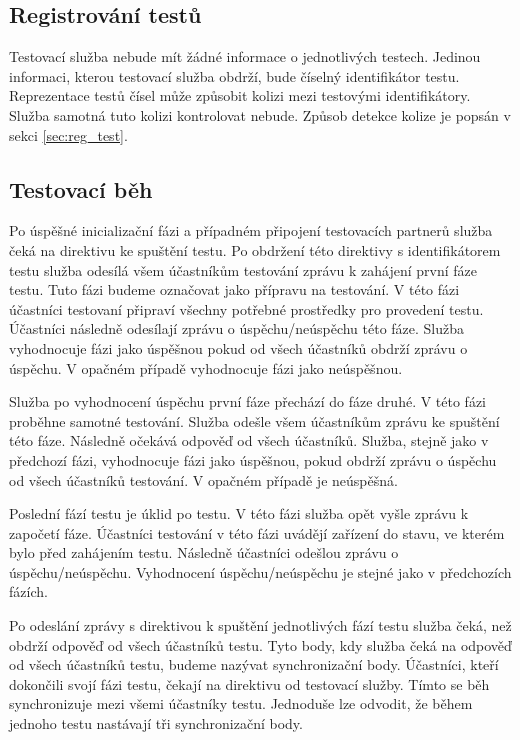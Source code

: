 \subsection{Registrování testů}
Testovací služba nebude mít žádné informace o jednotlivých testech. Jedinou informaci, kterou testovací služba obdrží, bude číselný identifikátor testu. Reprezentace testů čísel může způsobit kolizi mezi testovými identifikátory. Služba samotná tuto kolizi kontrolovat nebude. Způsob detekce kolize je popsán v sekci \ref{sec:reg_test}.

\subsection{Testovací běh}\label{sec:test_run}
Po úspěšné inicializační fázi a případném připojení testovacích partnerů služba čeká na direktivu ke spuštění testu. Po obdržení této direktivy s identifikátorem testu služba odesílá všem účastníkům testování zprávu k zahájení první fáze testu. Tuto fázi budeme označovat jako přípravu na testování. V této fázi účastníci testovaní připraví všechny potřebné prostředky pro provedení testu. Účastníci následně odesílají zprávu o úspěchu/neúspěchu této fáze. Služba vyhodnocuje fázi jako úspěšnou pokud od všech účastníků obdrží zprávu o úspěchu. V opačném případě vyhodnocuje fázi jako neúspěšnou.

Služba po vyhodnocení úspěchu první fáze přechází do fáze druhé. V této fázi proběhne samotné testování. Služba odešle všem účastníkům zprávu ke spuštění této fáze. Následně očekává odpověď od všech účastníků. Služba, stejně jako v předchozí fázi, vyhodnocuje fázi jako úspěšnou, pokud obdrží zprávu o úspěchu od všech účastníků testování. V opačném případě je neúspěšná.

Poslední fází testu je úklid po testu. V této fázi služba opět vyšle zprávu k započetí fáze. Účastníci testování v této fázi uvádějí zařízení do stavu, ve kterém bylo před zahájením testu. Následně účastníci odešlou zprávu o úspěchu/neúspěchu. Vyhodnocení úspěchu/neúspěchu je stejné jako v předchozích fázích.

Po odeslání zprávy s direktivou k spuštění jednotlivých fází testu služba čeká, než obdrží odpověď od všech účastníků testu. Tyto body, kdy služba čeká na odpověď od všech účastníků testu, budeme nazývat synchronizační body. Účastníci, kteří dokončili svojí fázi testu, čekají na direktivu od testovací služby. Tímto se běh synchronizuje mezi všemi účastníky testu. Jednoduše lze odvodit, že během jednoho testu nastávají tři synchronizační body. 

